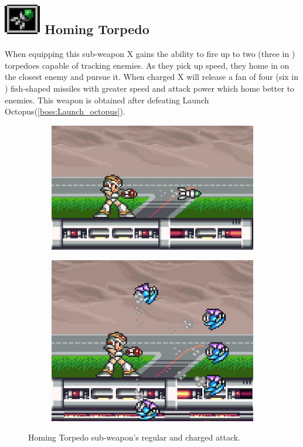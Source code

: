 \subsection{\includegraphics[scale=0.2]{figures/X1/Launch_octopus/Homing_t.png} Homing Torpedo}\label{Homing_torpedo}
When equipping this sub-weapon X gains the ability to fire up to two (three in \mhx)\cite{wiki:Homing_torpedo} torpedoes capable of tracking enemies. As they pick up speed, they home in on the closest enemy and pursue it. When charged X will release a fan of four (six in \mhx) fish-shaped missiles with greater speed and attack power which home better to enemies. This weapon is obtained after defeating Launch Octopus(\ref{boss:Launch_octopus}).
\begin{figure}[htp]
	\centering
	\begin{subfigure}{0.39\linewidth}
		\includegraphics[width=\linewidth]{figures/X1/weapons/Homing_torpedo_1.jpg}	
	\end{subfigure}
		\begin{subfigure}{0.3\linewidth}
		\includegraphics[width=\linewidth]{figures/X1/weapons/Homing_torpedo_2.jpg}	
	\end{subfigure}
	\caption{Homing Torpedo sub-weapon's regular and charged attack.}
\end{figure}

